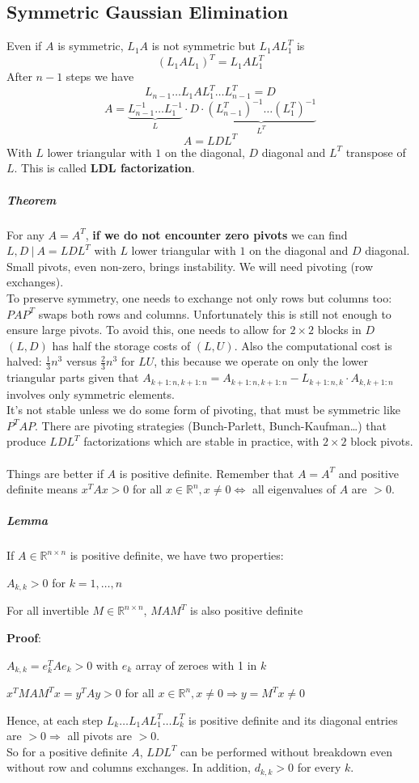 \documentclass[10pt]{report}
\begin{document}
\subsection{Symmetric Gaussian Elimination} Even if $A$ is symmetric, $L_1A$ is not symmetric but $L_1AL_1^T$ is
$$(L_1AL_1)^T = L_1AL_1^T$$
After $n-1$ steps we have $$L_{n-1}\ldots L_1AL_1^T\ldots L_{n-1}^T = D$$
$$A = \underset{L}{\underbrace{L_{n-1}^{-1}\ldots L_1^{-1}}}\cdot D\cdot \underset{L^T}{\underbrace{(L_{n-1}^T)^{-1}\ldots(L_1^T)^{-1}}}$$
$$A = L D L^T$$
With $L$ lower triangular with $1$ on the diagonal, $D$ diagonal and $L^T$ transpose of $L$. This is called \textbf{LDL factorization}.
\subparagraph{Theorem} For any $A=A^T$, \textbf{if we do not encounter zero pivots} we can find $L,D\:|\:A = L DL^T$ with $L$ lower triangular with $1$ on the diagonal and $D$ diagonal.\\
Small pivots, even non-zero, brings instability. We will need pivoting (row exchanges).\\
To preserve symmetry, one needs to exchange not only rows but columns too: $PAP^T$ swaps both rows and columns. Unfortunately this is still not enough to ensure large pivots. To avoid this, one needs to allow for $2\times 2$ blocks in $D$\\
$(L,D)$ has half the storage costs of $(L,U)$. Also the computational cost is halved: $\frac{1}{3}n^3$ versus $\frac{2}{3}n^3$ for $LU$, this because we operate on only the lower triangular parts given that $A_{k+1:n,k+1:n} = A_{k+1:n,k+1:n}-L_{k+1:n,k}\cdot A_{k,k+1:n}$ involves only symmetric elements.\\
It's not stable unless we do some form of pivoting, that must be symmetric like $P^TAP$. There are pivoting strategies (Bunch-Parlett, Bunch-Kaufman\ldots) that produce $LDL^T$ factorizations which are stable in practice, with $2\times2$ block pivots.\\\\
Things are better if $A$ is positive definite. Remember that $A = A^T$ and positive definite means $x^TAx>0$ for all $x\in \mathbb{R}^n,x\neq 0\Leftrightarrow$ all eigenvalues of $A$ are $>0$.
\subparagraph{Lemma} If $A\in \mathbb{R}^{n\times n}$ is positive definite, we have two properties:
\begin{list}{}{}
	\item $A_{k,k}>0$ for $k=1,\ldots,n$
	\item For all invertible $M\in \mathbb{R}^{n\times n}$, $MAM^T$ is also positive definite
\end{list}
\textbf{Proof}: \begin{list}{}{}
	\item $A_{k,k}=e_k^TAe_k > 0$ with $e_k$ array of zeroes with 1 in $k$
	\item $x^TMAM^Tx = y^TAy > 0$ for all $x\in \mathbb{R}^n, x\neq 0\Rightarrow y= M^Tx \neq 0$
\end{list}
Hence, at each step $L_k\ldots L_1AL_1^T\ldots L_k^T$ is positive definite and its diagonal entries are $>0\Rightarrow$ all pivots are $>0$.\\
So for a positive definite $A$, $LDL^T$ can be performed without breakdown even without row and columns exchanges. In addition, $d_{k,k}>0$ for every $k$.
\end{document}
